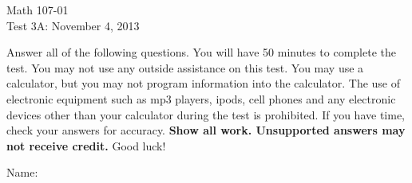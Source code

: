 \documentclass[12pt]{article}
\begin{document}
\pagestyle{empty}


\begin{center}
\begin{large}
Math 107-01\\
Test 3A: November 4, 2013
\end{large}
\end{center}

\begin{small} Answer all of the following questions.  You will have 50 minutes to complete the
test. You may not use any outside assistance on this test.  You may use a
calculator, but you may not program information into the calculator. The use of
electronic equipment such as mp3 players, ipods, cell phones and any
electronic devices other than your calculator during the test is
prohibited.  If you have time, check your answers for accuracy.  \textbf{Show all work. Unsupported answers may not
receive credit.}  Good luck!\end{small}

\vspace{ .15 in}
Name: \underline{\qquad \qquad \qquad \qquad \qquad \qquad \qquad \qquad \qquad \qquad}\\
\end{document}
